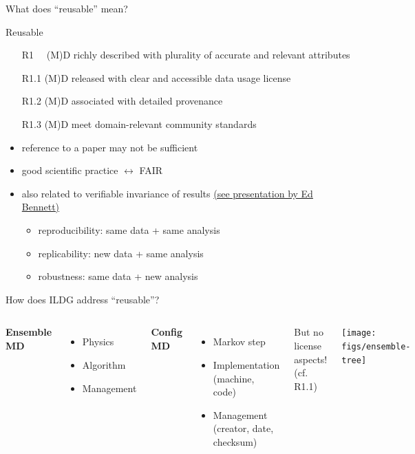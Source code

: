 \documentclass[aspectratio=169,xcolor=dvipsnames]{beamer}
\def\figs{figs2}
\begin{document}
\begin{frame}{What does ``reusable'' mean?}
  \begin{alertblock}{Reusable}
    \begin{itemize}
    \item[R1~~] (M)D richly described with plurality of accurate and relevant attributes
    \item[R1.1] (M)D released with clear and accessible data usage license
    \item[R1.2] (M)D associated with detailed provenance
    \item[R1.3] (M)D meet domain-relevant community standards
    \end{itemize}
  \end{alertblock}

  \begin{itemize}
  \item reference to a paper may not be sufficient
  \item good scientific practice $\leftrightarrow$ FAIR
  \item also related to verifiable invariance of results
    \hfill {\small \href{https://inspirehep.net/literature/2601251}  {  (see presentation by Ed Bennett)}   }
    \begin{itemize}
    \item reproducibility: same data + same analysis
    \item replicability: new data + same analysis
    \item robustness: same data + new analysis
    \end{itemize}
  \end{itemize}

  \vfill

\end{frame}
\begin{frame}{How does ILDG address ``reusable''?}
  \begin{columns}[c] 
    {\bf Ensemble MD}
    \begin{itemize}
    \item Physics
    \item Algorithm
    \item Management
    \end{itemize}

    \vspace*{5mm}
    {\bf Config MD}
    \begin{itemize}
    \item Markov step
    \item Implementation (machine, code)
    \item Management (creator, date, checksum)
    \end{itemize}

    \vspace*{5mm}
    But \alert{no} license aspects! (cf. R1.1)

    \hspace*{-5mm}\texttt{[image: \\figs/ensemble-tree]}
  \end{columns}
\end{frame}
\end{document}
